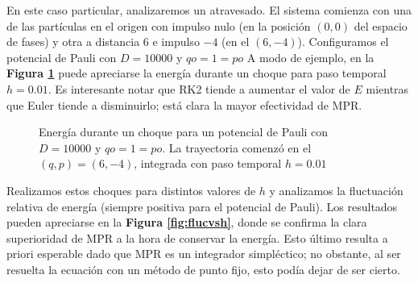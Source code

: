 \documentclass[twoside, 12pt]{article}
\begin{document}
En este caso particular, analizaremos un atravesado.
El sistema comienza con una de las partículas en el origen con impulso nulo (en la posición $(0, 0)$ del espacio de fases) y otra a distancia $6$ e impulso $-4$ (en el $(6, -4)$).
Configuramos el potencial de Pauli con $D = 10000$ y $qo = 1 = po$
A modo de ejemplo, en la \textbf{Figura \ref{fig:energ_choq}} puede apreciarse la energía durante un choque para paso temporal $h=0.01$.
Es interesante notar que RK2 tiende a aumentar el valor de $E$ mientras que Euler tiende a disminuirlo; está clara la mayor efectividad de MPR.

\begin{figure}[h]
	\centering
	\caption{Energía durante un choque para un potencial de Pauli con $D = 10000$ y $qo = 1 = po$. La trayectoria comenzó en el $(q, p) = (6, -4)$, integrada con paso temporal $h=0.01$}
	\label{fig:energ_choq}
\end{figure}

Realizamos estos choques para distintos valores de $h$ y analizamos la fluctuación relativa de energía (siempre positiva para el potencial de Pauli).
Los resultados pueden apreciarse en la \textbf{Figura \ref{fig:flucvsh}}, donde se confirma la clara superioridad de MPR a la hora de conservar la energía.
Esto último resulta a priori esperable dado que MPR es un integrador simpléctico; no obstante, al ser resuelta la ecuación con un método de punto fijo, esto podía dejar de ser cierto.
\end{document}
